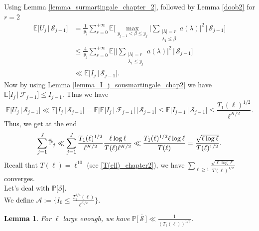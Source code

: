 \documentclass{article}
\newtheorem{lemma}[theorem]{Lemma}
\begin{document}
Using Lemma \ref{lemma_surmartingale_chapter_2}, followed by Lemma \ref{doob2} for $r=2$
$$
\begin{aligned}
     \mathbb{E}\big[ U_j \, \big|\,\mathcal{S}_{j-1}\big] & =  \frac{1}{ y_j}\sum_{r=0}^{+\infty}\mathbb{E}\bigg[ \max_{y_{j-1}<\beta \leqslant y_j} \bigg| \sum_{\substack{|\lambda|=r \\ \lambda_1 \leqslant \beta}} a(\lambda)\bigg|^2  \, \big|\,\mathcal{S}_{j-1}\bigg] 
     \\& \leqslant  \frac{4}{ y_j}\sum_{r=0}^{+\infty}\mathbb{E}\bigg[  \bigg| \sum_{\substack{|\lambda|=r \\ \lambda_1 \leqslant y_j}} a(\lambda)\bigg|^2  \, \big|\,\mathcal{S}_{j-1}\bigg]
     \\ & \ll \mathbb{E}\big[I_j\,\big|\, \mathcal{S}_{j-1}\big].
\end{aligned}
$$
Now by using Lemma \ref{lemma_I_j_sousmartingale_chap2} we have $\mathbb{E}\big[I_j\,\big|\, \mathcal{F}_{j-1}\big]\leqslant I_{j-1}.$
Thus we have 
$$
\mathbb{E}\big[ U_j \, \big|\,\mathcal{S}_{j-1}\big] \ll \mathbb{E}\big[I_j\,\big|\, \mathcal{S}_{j-1}\big] = \mathbb{E}\bigg[\mathbb{E}\big[I_j\,\big|\, \mathcal{F}_{j-1}\big]\,\big|\, \mathcal{S}_{j-1}\bigg] \leqslant \mathbb{E}\big[I_{j-1}\,\big|\, \mathcal{S}_{j-1}\big]\leqslant \frac{T_1(\ell)^{1/2}}{\ell^{K/2}}.
$$
Thus, we get at the end
\begin{equation}\label{sum_P_j_tilde_chapter2}
    \sum_{j=1}^{J} \Tilde{\mathbb{P}}_j\ll \sum_{j=1}^{J} \frac{T_1(\ell)^{1/2}}{\ell^{K/2}} \frac{\ell \log \ell}{T(\ell) \ell^{K/2}} \ll \frac{T_1(\ell)^{1/2}\ell \log \ell}{T(\ell)}=\frac{\sqrt{\ell \log \ell}}{T(\ell)^{1/2}}.
\end{equation}
Recall that $T(\ell) = \ell^{10}$ (see \eqref{T(ell)_chapter2}), we have $\sum_{\ell \geqslant 1} \frac{\sqrt{\ell \log \ell}}{T(\ell)^{1/2}}$ converges.\\
Let's deal with $ \mathbb{P}\big[ \mathcal{S}\big]$.\\
We define $\mathcal{A}:= \big\{ I_0\leqslant \frac{T_1^{1/4}(\ell)}{\ell^{K/2}} \big\}$.
\begin{lemma}\label{P(S)_chapter2}
    For $\ell$ large enough, we have $\mathbb{P}\big[\,\overline{\mathcal{S}}\,\big]\ll\frac{1}{(T_1(\ell))^{1/6}}$.
\end{lemma}
\end{document}
